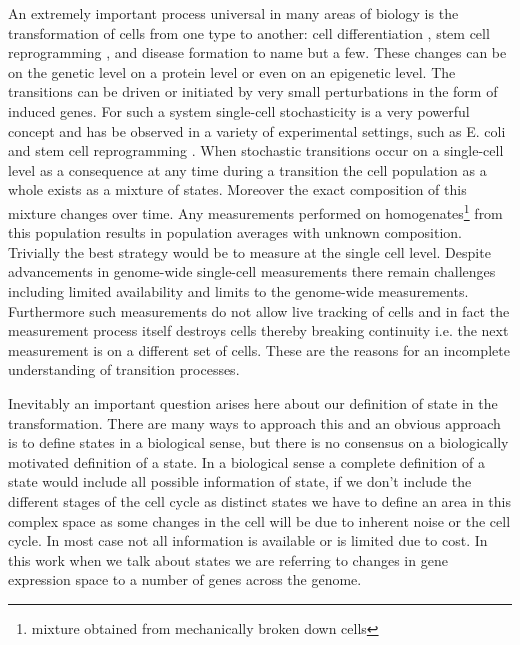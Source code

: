 An extremely important process universal in many areas of biology is the transformation of cells from one type to another: cell differentiation \citep{Tang:2010ed, Vierbuchen:2010fa}, stem cell reprogramming \citep{Takahashi:2006hi, Hanna:2010jy}, and disease formation \citep{Hannah:2000wo, Vogel:2010jb} to name but a few. These changes can be on the genetic level on a protein level or even on an epigenetic level. The transitions can be driven or initiated by very small perturbations in the form of induced genes. For such a system single-cell stochasticity is a very powerful concept and has be observed in a variety of experimental settings, such as E. coli  \citep{Elowitz:2002hb} and stem cell reprogramming \citep{Hanna:2009ix}. When stochastic transitions occur on a single-cell level as a consequence at any time during a transition the cell population as a whole exists as a mixture of states. Moreover the exact composition of this mixture changes over time. Any measurements performed on homogenates\footnote{mixture obtained from mechanically broken down cells} from this population results in population averages with unknown composition. Trivially the best strategy would be to measure at the single cell level. Despite advancements in genome-wide single-cell measurements \citep{deSouza:2012dz, Tang:2011gt} there remain challenges including limited availability and limits to the genome-wide measurements. Furthermore such measurements do not allow live tracking of cells and in fact the measurement process itself destroys cells thereby breaking continuity i.e. the next measurement is on a different set of cells. These are the reasons for an incomplete understanding of transition processes. 

Inevitably an important question arises here about our definition of state in the transformation. There are many ways to approach this and an obvious approach is to define states in a biological sense, but there is no consensus on a biologically motivated definition of a state. In a biological sense a complete definition of a state would include all possible information of state, if we don't include the different stages of the cell cycle as distinct states we have to define an area in this complex space as some changes in the cell will be due to inherent noise or the cell cycle. In most case not all information is available or is limited due to cost. In this work when we talk about states we are referring to changes in gene expression space to a number of genes across the genome.

